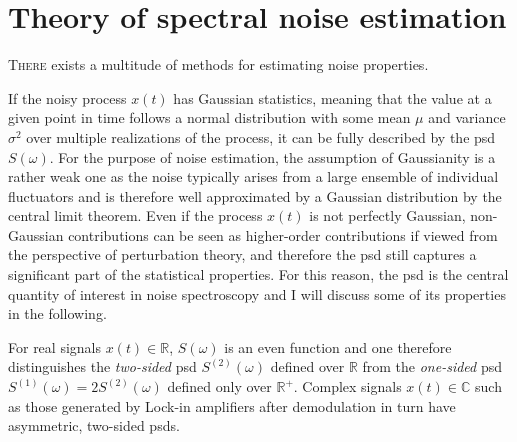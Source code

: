 \chapter{Theory of spectral noise estimation}\label{ch:speck:theory}
\lettrine[lines=1]{T}{here} exists a multitude of methods for estimating noise properties.

If the noisy process $x(t)$
has Gaussian statistics, meaning that the value at a given point in time follows a normal distribution with some mean $\mu$ and variance $\sigma^2$ over multiple realizations of the process, it can be fully described by the \gls{psd} $S(\omega)$.
For the purpose of noise estimation, the assumption of Gaussianity is a rather weak one as the noise typically arises from a large ensemble of individual fluctuators and is therefore well approximated by a Gaussian distribution by the central limit theorem.
Even if the process $x(t)$ is not perfectly Gaussian, non-Gaussian contributions can be seen as higher-order contributions if viewed from the perspective of perturbation theory, and therefore the \gls{psd} still captures a significant part of the statistical properties.
For this reason, the \gls{psd} is the central quantity of interest in noise spectroscopy and I will discuss some of its properties in the following.

For real signals $x(t) \in\mathbb{R}$, $S(\omega)$ is an even function and one therefore distinguishes the \emph{two-sided} \gls{psd} $S^{(2)}(\omega)$ defined over $\mathbb{R}$ from the \emph{one-sided} \gls{psd} $S^{(1)}(\omega) = 2 S^{(2)}(\omega)$ defined only over $\mathbb{R}^+$.
Complex signals $x(t)\in\mathbb{C}$ such as those generated by Lock-in amplifiers after demodulation in turn have asymmetric, two-sided \glspl{psd}.

